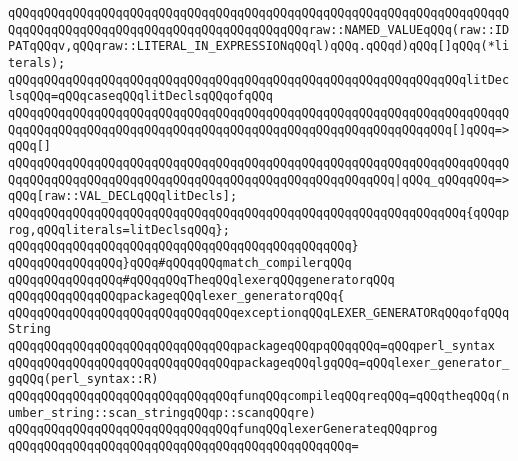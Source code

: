 \verb|qQQqqQQqqQQqqQQqqQQqqQQqqQQqqQQqqQQqqQQqqQQqqQQqqQQqqQQqqQQqqQQqqQQqqQQqqQQqqQQqqQQqqQQqqQQqqQQqqQQqqQQqqQQqqQQqraw::NAMED_VALUEqQQq(raw::IDPATqQQqv,qQQqraw::LITERAL_IN_EXPRESSIONqQQql)qQQq.qQQqd)qQQq[]qQQq(*literals);|\newline
\newline
\verb|qQQqqQQqqQQqqQQqqQQqqQQqqQQqqQQqqQQqqQQqqQQqqQQqqQQqqQQqqQQqqQQqlitDeclsqQQq=qQQqcaseqQQqlitDeclsqQQqofqQQq|\newline
\verb|qQQqqQQqqQQqqQQqqQQqqQQqqQQqqQQqqQQqqQQqqQQqqQQqqQQqqQQqqQQqqQQqqQQqqQQqqQQqqQQqqQQqqQQqqQQqqQQqqQQqqQQqqQQqqQQqqQQqqQQqqQQqqQQqqQQq[]qQQq=>qQQq[]|\newline
\verb|qQQqqQQqqQQqqQQqqQQqqQQqqQQqqQQqqQQqqQQqqQQqqQQqqQQqqQQqqQQqqQQqqQQqqQQqqQQqqQQqqQQqqQQqqQQqqQQqqQQqqQQqqQQqqQQqqQQqqQQqqQQq|\verb#|qQQq_qQQqqQQq=>qQQq[raw::VAL_DECLqQQqlitDecls];#\newline
\newline
\verb|qQQqqQQqqQQqqQQqqQQqqQQqqQQqqQQqqQQqqQQqqQQqqQQqqQQqqQQqqQQqqQQq{qQQqprog,qQQqliterals=litDeclsqQQq};|\newline
\verb|qQQqqQQqqQQqqQQqqQQqqQQqqQQqqQQqqQQqqQQqqQQqqQQq}|\newline
\verb|qQQqqQQqqQQqqQQq}qQQq#qQQqqQQqmatch_compilerqQQq|\newline
\newline
\newline
\verb|qQQqqQQqqQQqqQQq#qQQqqQQqTheqQQqlexerqQQqgeneratorqQQq|\newline
\verb|qQQqqQQqqQQqqQQqpackageqQQqlexer_generatorqQQq{|\newline
\newline
\newline
\verb|qQQqqQQqqQQqqQQqqQQqqQQqqQQqqQQqexceptionqQQqLEXER_GENERATORqQQqofqQQqString|\newline
\verb|qQQqqQQqqQQqqQQqqQQqqQQqqQQqqQQqpackageqQQqpqQQqqQQq=qQQqperl_syntax|\newline
\verb|qQQqqQQqqQQqqQQqqQQqqQQqqQQqqQQqpackageqQQqlgqQQq=qQQqlexer_generator_gqQQq(perl_syntax::R)|\newline
\newline
\verb|qQQqqQQqqQQqqQQqqQQqqQQqqQQqqQQqfunqQQqcompileqQQqreqQQq=qQQqtheqQQq(number_string::scan_stringqQQqp::scanqQQqre)|\newline
\newline
\verb|qQQqqQQqqQQqqQQqqQQqqQQqqQQqqQQqfunqQQqlexerGenerateqQQqprog|\newline
\verb|qQQqqQQqqQQqqQQqqQQqqQQqqQQqqQQqqQQqqQQqqQQqqQQq=|\newline
